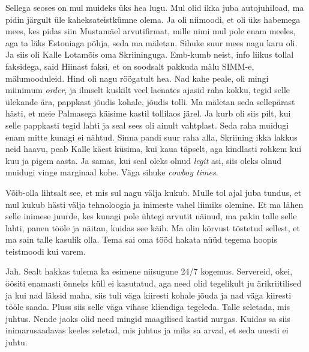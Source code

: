 
Sellega seoses on mul muideks üks hea lugu. Mul olid ikka juba autojuhiload, ma pidin järgult üle kaheksateistkümne olema. Ja oli niimoodi, et oli üks habemega mees, kes pidas siin Mustamäel arvutifirmat, mille nimi mul pole enam meeles, aga ta läks Estoniaga põhja, seda ma mäletan. Sihuke suur mees nagu karu oli. Ja siis oli Kalle Lotamõis oma Skriininguga. Emb-kumb neist, info liikus tollal faksidega, said Hiinast faksi, et on soodsalt pakkuda mälu SIMM-e, mälumooduleid. Hind oli nagu röögatult hea. Nad kahe peale, oli mingi miinimum \emph{order},  ja ilmselt kuskilt veel  laenates ajasid raha kokku, tegid selle ülekande ära, pappkast jõudis kohale, jõudis tolli. Ma mäletan seda sellepärast hästi, et meie Palmasega käisime kastil tollilaos järel. Ja kurb oli siis pilt, kui selle pappkasti tegid lahti ja seal sees oli ainult vahtplast. Seda raha muidugi enam mitte kunagi ei nähtud. Sinna pandi suur raha alla, Skriining ikka lakkus neid haavu, peab Kalle käest küsima, kui kaua täpselt, aga kindlasti rohkem kui kuu ja pigem aasta. Ja samas, kui seal oleks olnud \emph{legit} asi, siis  oleks olnud muidugi vinge marginaal kohe. Väga sihuke \emph{cowboy times}. 


Võib-olla lihtsalt see, et mis sul nagu välja kukub. Mulle tol ajal juba tundus, et mul kukub hästi välja tehnoloogia ja inimeste vahel  liimiks olemine. Et ma lähen selle inimese juurde, kes kunagi pole ühtegi arvutit näinud, ma pakin talle selle lahti, panen tööle ja näitan, kuidas see käib. Ma olin kõrvust tõstetud sellest, et ma sain talle kasulik olla. Tema sai oma tööd hakata nüüd tegema hoopis teistmoodi kui varem. 


Jah. Sealt hakkas tulema ka  esimene niisugune 24/7 kogemus. Servereid, okei, öösiti enamasti õnneks küll ei kasutatud, aga need olid tegelikult ju ärikriitilised ja kui nad läksid maha, siis tuli väga kiiresti kohale jõuda ja nad väga kiiresti tööle saada. Pluss siis selle väga vihase kliendiga tegeleda. Talle seletada, mis juhtus. Nende jaoks olid need mingid maagilised kastid nurgas. Kuidas sa siis inimarusaadavas keeles seletad, mis juhtus ja miks sa arvad, et seda uuesti ei juhtu.

